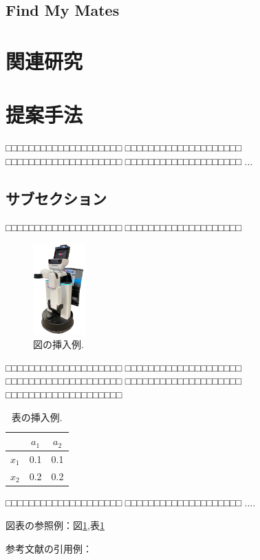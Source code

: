 \documentclass[a4j]{jarticle}
\begin{document}
\subsection{Find My Mates}


\section{関連研究}


\section{提案手法}

□□□□□□□□□□□□□□□□□□□□
□□□□□□□□□□□□□□□□□□□□
□□□□□□□□□□□□□□□□□□□□
□□□□□□□□□□□□□□□□□□□□
...

\subsection{サブセクション}
□□□□□□□□□□□□□□□□□□□□
□□□□□□□□□□□□□□□□□□□□
%
\begin{figure}[ht]
  \centering
  \includegraphics[width=2cm]{images/hsr_front.png}
  \caption{図の挿入例.}
  \label{fig:ex1}
\end{figure}
%
□□□□□□□□□□□□□□□□□□□□
□□□□□□□□□□□□□□□□□□□□
□□□□□□□□□□□□□□□□□□□□
□□□□□□□□□□□□□□□□□□□□
□□□□□□□□□□□□□□□□□□□□
%
\begin{table}[h]
  \centering
  \caption {表の挿入例.}
  \label{table:ex1}
  \begin{tabular}{c|cc}
    \hline
           & $a_1$ & $a_2$ \\ \hline
    $x_1$  &  0.1  &  0.1  \\
    $x_2$  &  0.2  &  0.2  \\ \hline
  \end{tabular}
\end{table}
%
□□□□□□□□□□□□□□□□□□□□
□□□□□□□□□□□□□□□□□□□□
....

図表の参照例：図\ref{fig:ex1},表\ref{fig:ex1}

参考文献の引用例：\cite{Sample1}\cite{Sample2}

\end{document}
